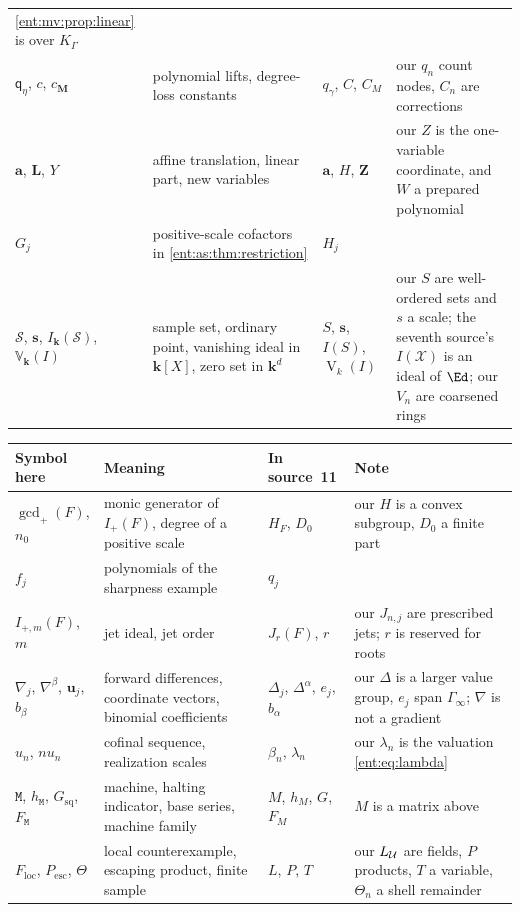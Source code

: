 \documentclass[11pt]{article}
\theoremstyle{plain}
\theoremstyle{plain}
\theoremstyle{plain}
\theoremstyle{definition}
\theoremstyle{definition}
\theoremstyle{definition}
\theoremstyle{definition}
\theoremstyle{remark}
\newcommand{\K}{K_\Gamma}\newcommand{\KD}{K_\Delta}
\newcommand{\kk}{\mathbf k}\newcommand{\PP}{\mathbb P}
\begin{document}
\begin{center}
\begin{tabularx}{\textwidth}{@{}P{0.2\textwidth}P{0.3\textwidth}P{0.17\textwidth}Y@{}}
\cref{ent:mv:prop:linear} is over $\K$\\[0.3em]
$\mathsf q_\eta$, $c$, $c_{\mathbf M}$ & polynomial lifts, degree-loss
constants & $q_\gamma$, $C$, $C_M$ & our $q_n$ count nodes, $C_n$ are
corrections\\[0.3em]
$\mathbf a$, $\mathbf L$, $Y$ & affine translation, linear part, new variables
& $\boldsymbol a$, $H$, $\boldsymbol Z$ & our $Z$ is the one-variable
coordinate, and $W$ a prepared polynomial\\[0.3em]
$G_j$ & positive-scale cofactors in \cref{ent:as:thm:restriction} & $H_j$ &
\\[0.3em]
$\mathcal S$, $\mathbf s$, $I_\kk(\mathcal S)$, $\mathbb V_\kk(I)$ & sample
set, ordinary point, vanishing ideal in $\kk[X]$, zero set in $\kk^d$ & $S$,
$\boldsymbol s$, $I(S)$, $\operatorname V_k(I)$ & our $S$ are well-ordered
sets and $s$ a scale; the seventh source's $I(\mathcal X)$ is an ideal of
$\Ed$; our $V_n$ are coarsened rings\\[0.3em]
\bottomrule
\end{tabularx}
\end{center}

\begin{center}\small
\begin{tabularx}{\textwidth}{@{}P{0.2\textwidth}P{0.3\textwidth}P{0.17\textwidth}Y@{}}
\toprule
Symbol here & Meaning & In source~11 & Note\\\midrule
$\gcd_+(F)$, $n_0$ & monic generator of $I_+(F)$, degree of a positive scale &
$H_F$, $D_0$ & our $H$ is a convex subgroup, $D_0$ a finite part\\[0.3em]
$f_j$ & polynomials of the sharpness example & $q_j$ & \\[0.3em]
$I_{+,m}(F)$, $m$ & jet ideal, jet order & $J_r(F)$, $r$ & our $J_{n,j}$ are
prescribed jets; $r$ is reserved for roots\\[0.3em]
$\nabla_j$, $\nabla^\beta$, $\mathbf u_j$, $b_\beta$ & forward differences,
coordinate vectors, binomial coefficients & $\Delta_j$, $\Delta^\alpha$,
$e_j$, $b_\alpha$ & our $\Delta$ is a larger value group, $e_j$ span
$\Gamma_\infty$; $\nabla$ is not a gradient\\[0.3em]
$u_n$, $nu_n$ & cofinal sequence, realization scales & $\beta_n$,
$\lambda_n$ & our $\lambda_n$ is the valuation \eqref{ent:eq:lambda}\\[0.3em]
$\mathtt M$, $h_{\mathtt M}$, $G_{\mathrm{sq}}$, $F_{\mathtt M}$ & machine,
halting indicator, base series, machine family & $M$, $h_M$, $G$, $F_M$ & $M$
is a matrix above\\[0.3em]
$F_{\mathrm{loc}}$, $P_{\mathrm{esc}}$, $\Theta$ & local counterexample,
escaping product, finite sample & $L$, $P$, $T$ & our $L_\mathcal U$ are fields,
$P$ products, $T$ a variable, $\Theta_n$ a shell remainder\\
\bottomrule
\end{tabularx}
\end{center}
\end{document}

